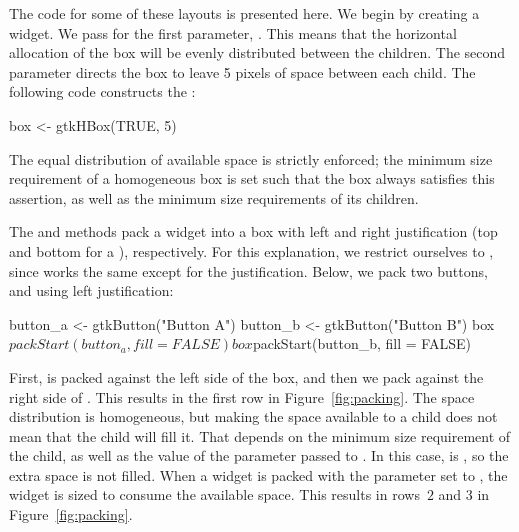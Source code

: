 The code for some of these layouts is presented here. We begin by
creating a  widget. We pass  for the first
parameter, . This means that the
horizontal allocation of the box will be evenly distributed between
the children.  The second parameter directs the box to leave 5 pixels
of space between each child.  The following code constructs the
:
\begin{Schunk}
\begin{Sinput}
 box <- gtkHBox(TRUE, 5)
\end{Sinput}
\end{Schunk}
The equal distribution of available space is strictly enforced; the
minimum size requirement of a homogeneous box is set such that the box
always satisfies this assertion, as well as the minimum size
requirements of its children.

The  and  methods pack a
widget into a box with left and right justification (top and
bottom for a ), respectively. For this explanation, we
restrict ourselves to , since
 works the same except for the
justification. Below, we pack two buttons,  and
 using left justification:
\begin{Schunk}
\begin{Sinput}
 button_a <- gtkButton("Button A")
 button_b <- gtkButton("Button B")
 box$packStart(button_a, fill = FALSE)
 box$packStart(button_b, fill = FALSE)
\end{Sinput}
\end{Schunk}
%
First,  is packed against the left side of the box,
and then we pack  against the right side of
. This results in the first row in
Figure~\ref{fig:packing}. The space distribution is homogeneous, but
making the space available to a child does not mean that the child
will fill it. That depends on the minimum size requirement of the
child, as well as the value of the 
parameter passed to . In this case,
 is , so the extra space
is not filled. When a widget is packed with the
 parameter set to , the
widget is sized to consume the available space. This results in
rows~$2$ and $3$ in Figure~\ref{fig:packing}.

